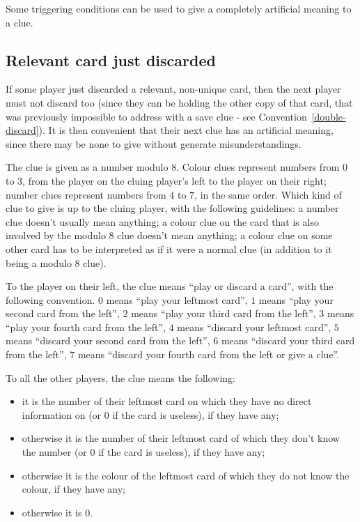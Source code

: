 \documentclass[a4paper]{article}
\theoremstyle{plain}
\theoremstyle{definition}
\begin{document}
Some triggering conditions can be used to give a completely artificial meaning to a clue.

\subsection{Relevant card just discarded}

If some player just discarded a relevant, non-unique card, then the next player must not discard too (since they can be holding the other copy of that card, that was previously impossible to address with a save clue - see Convention~\ref{double-discard}). It is then convenient that their next clue has an artificial meaning, since there may be none to give without generate misunderstandings.

The clue is given as a number modulo 8. Colour clues represent numbers from $0$ to $3$, from the player on the cluing player's left to the player on their right; number clues represent numbers from $4$ to $7$, in the same order. Which kind of clue to give is up to the cluing player, with the following guidelines: a number clue doesn't usually mean anything; a colour clue on the card that is also involved by the modulo 8 clue doesn't mean anything; a colour clue on some other card has to be interpreted as if it were a normal clue (in addition to it being a modulo 8 clue).

To the player on their left, the clue means ``play or discard a card'', with the following convention. $0$ means ``play your leftmost card'', $1$ means ``play your second card from the left'', $2$ means ``play your third card from the left'', $3$ means ``play your fourth card from the left'', $4$ means ``discard your leftmost card'', $5$ means ``discard your second card from the left'', $6$ means ``discard your third card from the left'', $7$ means ``discard your fourth card from the left or give a clue''.

To all the other players, the clue means the following:

\begin{itemize}
	\item it is the number of their leftmost card on which they have no direct information on (or $0$ if the card is useless), if they have any;
	\item otherwise it is the number of their leftmost card of which they don't know the number (or $0$ if the card is useless), if they have any;
	\item otherwise it is the colour of the leftmost card of which they do not know the colour, if they have any;
	\item otherwise it is $0$. 
\end{itemize}
\end{document}
